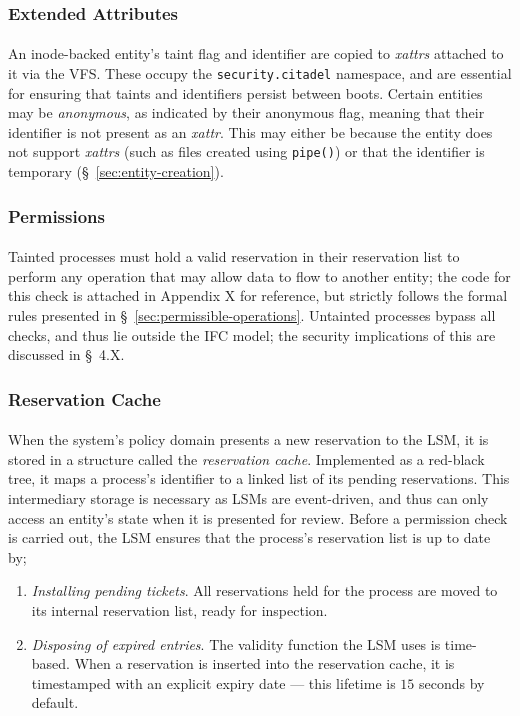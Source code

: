 \subsubsection{Extended Attributes} 
\paragraph{} An inode-backed entity's taint flag and identifier are copied to \textit{xattrs} attached to it via the VFS. These occupy the \texttt{security.citadel} namespace, and are essential for ensuring that taints and identifiers persist between boots. Certain entities may be \textit{anonymous}, as indicated by their anonymous flag, meaning that their identifier is not present as an \textit{xattr}. This may either be because the entity does not support \textit{xattrs} (such as files created using \texttt{pipe()}) or that the identifier is temporary (§~\ref{sec:entity-creation}).


\subsubsection{Permissions} 
\paragraph{} Tainted processes must hold a valid reservation in their reservation list to perform any operation that may allow data to flow to another entity; the code for this check is attached in Appendix X for reference, but strictly follows the formal rules presented in §~\ref{sec:permissible-operations}. Untainted processes bypass all checks, and thus lie outside the IFC model; the security implications of this are discussed in §~4.X.


\subsubsection{Reservation Cache} 
\paragraph{} When the system's policy domain presents a new reservation to the LSM, it is stored in a structure called the \textit{reservation cache}. Implemented as a red-black tree, it maps a process's identifier to a linked list of its pending reservations. This intermediary storage is necessary as LSMs are event-driven, and thus can only access an entity's state when it is presented for review. Before a permission check is carried out, the LSM ensures that the process's reservation list is up to date by;
\begin{enumerate}
    \item \textit{Installing pending tickets}. All reservations held for the process are moved to its internal reservation list, ready for inspection.
    \item \textit{Disposing of expired entries}. The validity function the LSM uses is time-based. When a reservation is inserted into the reservation cache, it is timestamped with an explicit expiry date --- this lifetime is $15$ seconds by default.  
\end{enumerate}



